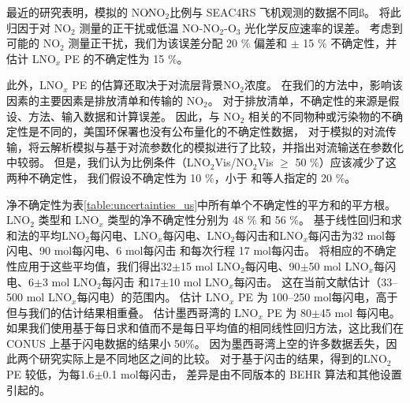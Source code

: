 最近的研究表明，模拟的 NO∕NO$_2$比例与 SEAC4RS 飞机观测的数据不同\citep{Travis.2016,Silvern.2018}ß。
\citet{Silvern.2018}将此归因于对 NO$_2$ 测量的正干扰或低温 NO-NO$_2$-O$_3$ 光化学反应速率的误差。
考虑到可能的 NO$_2$ 测量正干扰\citep{Allen.2019,Bucsela.2019}，我们为该误差分配 20 \% 偏差和 $\pm$ 15 \% 不确定性，并估计 LNO$_x$ PE 的不确定性为 15 \%。

此外，LNO$_x$ PE 的估算还取决于对流层背景NO$_2$浓度。
在我们的方法中，影响该因素的主要因素是排放清单和传输的 NO$_2$。
对于排放清单，不确定性的来源是假设、方法、输入数据和计算误差。
因此，与 NO$_2$ 相关的不同物种或污染物的不确定性是不同的，美国环保署也没有公布量化的不确定性数据，
对于模拟的对流传输，\citet{Li.2018}将云解析模拟与基于对流参数化的模拟进行了比较，并指出对流输送在参数化中较弱。
但是，我们认为比例条件（LNO$_2$Vis/NO$_2$Vis $\geq$ 50 \%）应该减少了这两种不确定性，
我们假设不确定性为 10 \%，小于 \citet{Allen.2019}和\citet{Bucsela.2019}等人指定的 20 \%。

净不确定性为表\ref{table:uncertainties_us}中所有单个不确定性的平方和的平方根。
LNO$_2$ 类型和 LNO$_x$ 类型的净不确定性分别为 48 \% 和 56 \%。
基于线性回归和求和法的平均LNO$_2$每闪电、LNO$_x$每闪电、LNO$_2$每闪击和LNO$_x$每闪击为32 mol每闪电、90 mol每闪电、6 mol每闪击 和每次行程 17 mol每闪击。
将相应的不确定性应用于这些平均值，我们得出32$\pm$15 mol LNO$_2$每闪电、90$\pm$50 mol LNO$_x$每闪电、6$\pm$3 mol LNO$_2$每闪击 和17$\pm$10 mol LNO$_x$每闪击。
这在当前文献估计（33--500 mol LNO$_x$每闪电）的范围内\citep{Schumann.2007,Beirle.2010,Bucsela.2010}。
\citet{Bucsela.2010}估计 LNO$_x$ PE 为 100--250 mol每闪电，高于但与我们的估计结果相重叠。
\citet{Pickering.2016}估计墨西哥湾的 LNO$_x$ PE 为 80$\pm$45 mol 每闪电。
如果我们使用基于每日求和值而不是每日平均值的相同线性回归方法，这比我们在 CONUS 上基于闪电数据的结果小 50\%。
因为墨西哥湾上空的许多数据丢失，因此两个研究实际上是不同地区之间的比较。
对于基于闪击的结果，\citet{Lapierre.2020}得到的LNO$_2$ PE 较低，为每1.6$\pm$0.1 mol每闪击，
差异是由不同版本的 BEHR 算法和其他设置引起的。


